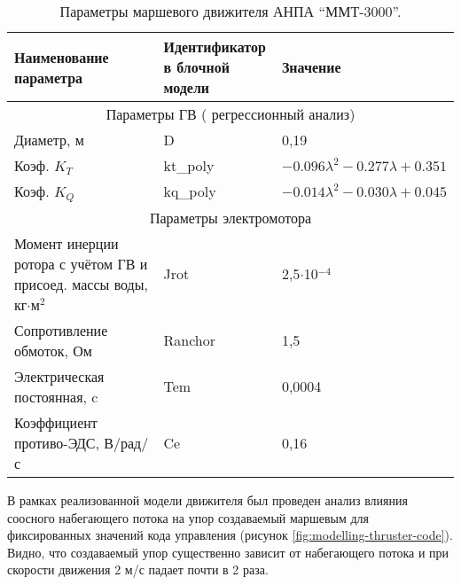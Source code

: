 \begin{table}
    \caption{Параметры маршевого движителя АНПА ``ММТ-3000''.}
    \label{tab:modelling-thruster}
    \centering
    \begin{tabular}{lll}
        \toprule
        \makecell[l]{Наименование \\ параметра} & \makecell[l]{Идентификатор \\ в блочной модели} & Значение \\
        \midrule
        \multicolumn{3}{c}{Параметры ГВ ( регрессионный анализ)} \\
        \midrule
        Диаметр, м  & D & 0,19\\
        Коэф. $K_T$ & kt\_poly & $-0.096\lambda^2 -0.277\lambda + 0.351$\\
        Коэф. $K_Q$ & kq\_poly & $-0.014\lambda^2 -0.030\lambda + 0.045$\\
        \midrule
        \multicolumn{3}{c}{Параметры электромотора} \\
        \midrule
        \makecell[l]{Момент инерции ротора \\
        с учётом ГВ и присоед. \\ массы воды, кг$\cdot$м$^2$} & Jrot & 2,5$\cdot$10$^{-4}$ \\
        Сопротивление обмоток, Ом & Ranchor & 1,5 \\
        Электрическая постоянная, c & Tem & 0,0004 \\
        \makecell[l]{Коэффициент \\ 
        противо-ЭДС, В/рад/с} & Ce & 0,16 \\
        \bottomrule
    \end{tabular}
\end{table}

В рамках реализованной модели движителя был проведен анализ влияния соосного набегающего потока на упор создаваемый маршевым для фиксированных значений кода управления (рисунок \ref{fig:modelling-thruster-code}).
Видно, что создаваемый упор существенно зависит от набегающего потока и при скорости движения 2 м/с падает почти в 2 раза.


